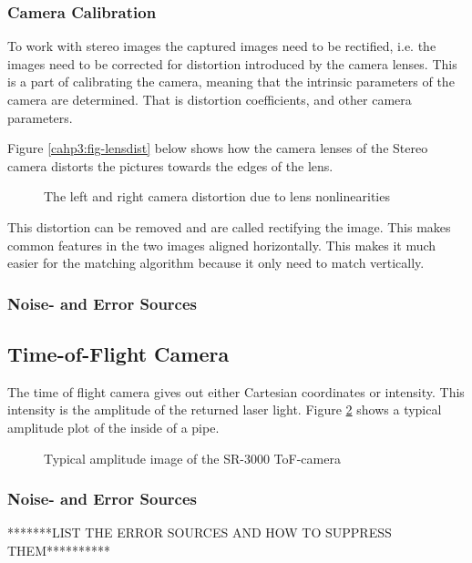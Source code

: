 \subsubsection{Camera Calibration}
To work with stereo images the captured images need to be rectified, i.e. the images need
to be corrected for distortion introduced by the camera lenses. This is a part of
calibrating the camera, meaning that the intrinsic parameters of the camera are
determined. That is distortion coefficients, and other camera parameters. 

Figure \ref{cahp3:fig-lensdist} below shows how the camera lenses of the Stereo camera distorts the pictures
towards the edges of the lens. 

\begin{figure}[htbp]
    \centering
    \caption{The left and right camera distortion due to lens nonlinearities}
    \label{chap3:fig-lensdist}
\end{figure}

This distortion can be removed and are called rectifying the image. This makes common
features in the two images aligned horizontally. This makes it much easier for the matching
algorithm because it only need to match vertically.


\subsubsection{Noise- and Error Sources}




\subsection{Time-of-Flight Camera}
The time of flight camera gives out either Cartesian coordinates or intensity. This
intensity is the amplitude of the returned laser light. Figure
\ref{chap3:fig-tof-amppicture} shows a typical amplitude plot of the inside of a pipe.
\begin{figure}[htbp]
    \centering
    \caption{Typical amplitude image of the SR-3000 ToF-camera}
    \label{chap3:fig-tof-amppicture}
\end{figure}



\subsubsection{Noise- and Error Sources}
*******LIST THE ERROR SOURCES AND HOW TO SUPPRESS THEM**********




